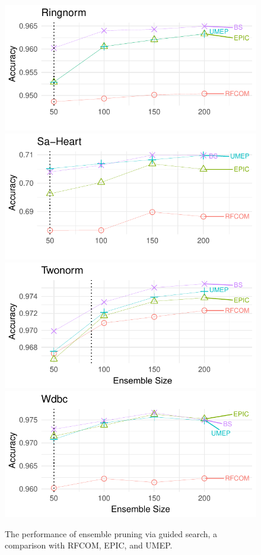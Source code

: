 \begin{figure}[!ht]
\begin{center}
\includegraphics[width=.494\textwidth]{5_Guided_Search/fig/S-ENS-Ringnorm.pdf}
\includegraphics[width=.494\textwidth]{5_Guided_Search/fig/S-ENS-Sa-Heart.pdf}\\
\includegraphics[width=.495\textwidth]{5_Guided_Search/fig/S-ENS-Twonorm.pdf}
\includegraphics[width=.495\textwidth]{5_Guided_Search/fig/S-ENS-Wdbc.pdf}\\
\end{center}
\caption{The performance of ensemble pruning via guided search, a comparison with RFCOM, EPIC, and UMEP.}
\label{ch5:comparison.nonreduced}
\end{figure}



